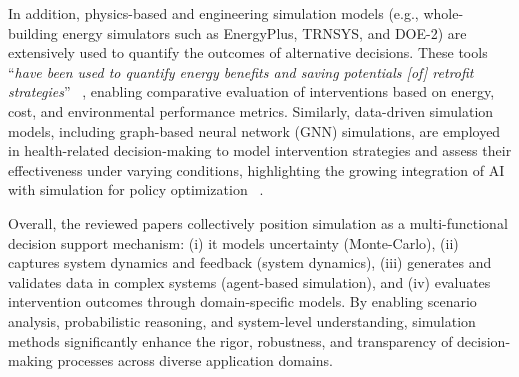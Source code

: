 \documentclass{sfuthesis}
\begin{document}
In addition, physics-based and engineering simulation models (e.g., whole-building energy simulators such as EnergyPlus, TRNSYS, and DOE-2) are extensively used to quantify the outcomes of alternative decisions. These tools “\textit{have been used to quantify energy benefits and saving potentials [of] retrofit strategies}” ~\cite{cecconi2022data}, enabling comparative evaluation of interventions based on energy, cost, and environmental performance metrics. Similarly, data-driven simulation models, including graph-based neural network (GNN) simulations, are employed in health-related decision-making to model intervention strategies and assess their effectiveness under varying conditions, highlighting the growing integration of AI with simulation for policy optimization ~\cite{li2024optimal}.\par
Overall, the reviewed papers collectively position simulation as a multi-functional decision support mechanism: (i) it models uncertainty (Monte-Carlo), (ii) captures system dynamics and feedback (system dynamics), (iii) generates and validates data in complex systems (agent-based simulation), and (iv) evaluates intervention outcomes through domain-specific models. By enabling scenario analysis, probabilistic reasoning, and system-level understanding, simulation methods significantly enhance the rigor, robustness, and transparency of decision-making processes across diverse application domains.
\end{document}
